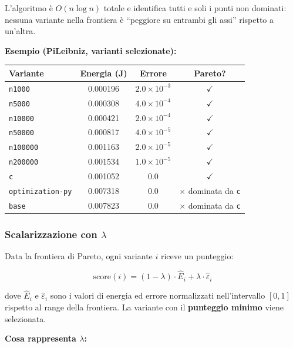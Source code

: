 \documentclass[a4paper,11pt]{article}
\begin{document}
L'algoritmo è $O(n \log n)$ totale e identifica tutti e soli i punti non dominati:
nessuna variante nella frontiera è ``peggiore su entrambi gli assi'' rispetto a
un'altra.

\medskip
\noindent\textbf{Esempio (PiLeibniz, varianti selezionate):}

\begin{table}[h!]
\centering
\small
\begin{tabular}{lccc}
\toprule
\textbf{Variante} & \textbf{Energia (J)} & \textbf{Errore} & \textbf{Pareto?} \\
\midrule
\texttt{n1000}          & 0.000196 & $2.0\times10^{-3}$ & $\checkmark$ \\
\texttt{n5000}          & 0.000308 & $4.0\times10^{-4}$ & $\checkmark$ \\
\texttt{n10000}         & 0.000421 & $2.0\times10^{-4}$ & $\checkmark$ \\
\texttt{n50000}         & 0.000817 & $4.0\times10^{-5}$ & $\checkmark$ \\
\texttt{n100000}        & 0.001163 & $2.0\times10^{-5}$ & $\checkmark$ \\
\texttt{n200000}        & 0.001534 & $1.0\times10^{-5}$ & $\checkmark$ \\
\texttt{c}              & 0.001052 & $0.0$              & $\checkmark$ \\
\texttt{optimization-py} & 0.007318 & $0.0$             & $\times$ dominata da \texttt{c} \\
\texttt{base}           & 0.007823 & $0.0$              & $\times$ dominata da \texttt{c} \\
\bottomrule
\end{tabular}
\end{table}

\subsubsection*{Scalarizzazione con \texorpdfstring{$\lambda$}{lambda}}

Data la frontiera di Pareto, ogni variante $i$ riceve un punteggio:

\[
  \text{score}(i) = (1 - \lambda) \cdot \hat{E}_i + \lambda \cdot \hat{\varepsilon}_i
\]

dove $\hat{E}_i$ e $\hat{\varepsilon}_i$ sono i valori di energia ed errore normalizzati
nell'intervallo $[0,1]$ rispetto al range della frontiera. La variante con il
\textbf{punteggio minimo} viene selezionata.

\medskip
\noindent\textbf{Cosa rappresenta $\lambda$:}
\end{document}
